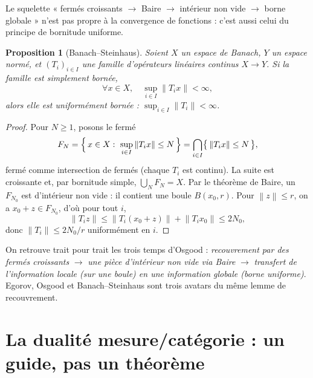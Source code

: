 \documentclass[11pt,a4paper]{article}
\theoremstyle{plain}
\newtheorem{proposition}{Proposition}
\theoremstyle{definition}
\newcommand{\1}{\mathbf{1}}
\newcommand{\norm}[1]{\left\lVert#1\right\rVert}
\begin{document}
Le squelette « fermés croissants $\to$ Baire $\to$ intérieur non vide $\to$ borne
globale » n'est pas propre à la convergence de fonctions : c'est aussi celui du
principe de bornitude uniforme.

\begin{proposition}[Banach--Steinhaus]\label{prop:bs}
Soient $X$ un espace de Banach, $Y$ un espace normé, et $(T_i)_{i\in I}$ une famille
d'opérateurs linéaires continus $X\to Y$. Si la famille est simplement bornée,
\[
  \forall x\in X,\quad \sup_{i\in I}\norm{T_i x}<\infty,
\]
alors elle est uniformément bornée : $\sup_{i\in I}\norm{T_i}<\infty$.
\end{proposition}

\begin{proof}
Pour $N\ge1$, posons le fermé
\[
  F_N=\Bigl\{\,x\in X:\ \sup_{i\in I}\norm{T_i x}\le N\,\Bigr\}
  =\bigcap_{i\in I}\bigl\{\,\norm{T_i x}\le N\,\bigr\},
\]
fermé comme intersection de fermés (chaque $T_i$ est continu). La suite est
croissante et, par bornitude simple, $\bigcup_N F_N=X$. Par le théorème de Baire,
un $F_{N_0}$ est d'intérieur non vide : il contient une boule $B(x_0,r)$. Pour
$\norm{z}\le r$, on a $x_0+z\in F_{N_0}$, d'où pour tout $i$,
\[
  \norm{T_i z}\le\norm{T_i(x_0+z)}+\norm{T_i x_0}\le 2N_0,
\]
donc $\norm{T_i}\le 2N_0/r$ uniformément en $i$.
\end{proof}

On retrouve trait pour trait les trois temps d'Osgood : \emph{recouvrement par des
fermés croissants} $\to$ \emph{une pièce d'intérieur non vide via Baire} $\to$
\emph{transfert de l'information locale (sur une boule) en une information globale
(borne uniforme)}. Egorov, Osgood et Banach--Steinhaus sont trois avatars du même
lemme de recouvrement.

\section{La dualité mesure/catégorie : un guide, pas un théorème}
\end{document}
